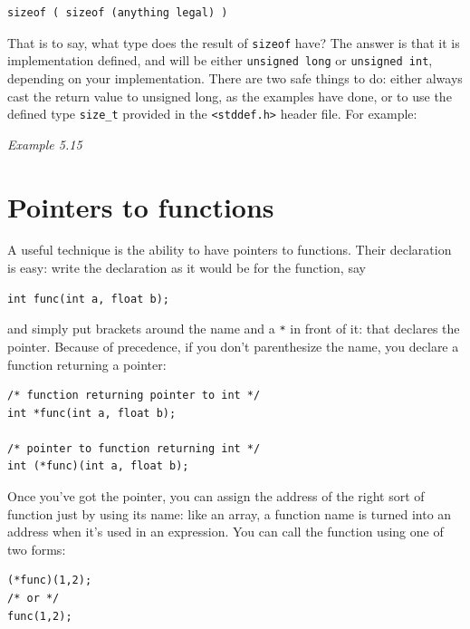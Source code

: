    \begin{Verbatim}
sizeof ( sizeof (anything legal) )
\end{Verbatim}

   That is to say, what type does the result of \texttt{sizeof} have?
    The answer is that it is implementation defined, and will be either
    \texttt{unsigned long} or \texttt{unsigned int}, depending on
    your implementation. There are two safe things to do: either always cast
    the return value to unsigned long, as the examples have done, or to use
    the defined type \texttt{size\_t} provided in the
    \texttt{<stddef.h>} header file. For example:


   \begin{center}\textit{Example 5.15}\end{center}


  

 
        \section{Pointers to functions}
        

  

  A useful technique is the ability to have pointers to functions. Their
   declaration is easy: write the declaration as it would be for the
   function, say


  \begin{Verbatim}
int func(int a, float b);
\end{Verbatim}

  and simply put brackets around the name and a \texttt{*} in front
   of it: that declares the pointer. Because of precedence, if you don't
   parenthesize the name, you declare a function returning a pointer:


  \begin{Verbatim}
/* function returning pointer to int */
int *func(int a, float b);

/* pointer to function returning int */
int (*func)(int a, float b);
\end{Verbatim}

  Once you've got the pointer, you can assign the address of the right
   sort of function just by using its name: like an array, a function name
   is turned into an address when it's used in an expression. You can call
   the function using one of two forms:


  \begin{Verbatim}
(*func)(1,2);
/* or */
func(1,2);
\end{Verbatim}

